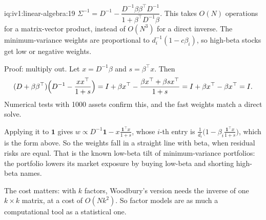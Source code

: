 \begin{solution}{iq:iv1:linear-algebra:19}
$\Sigma^{-1} = D^{-1} - \dfrac{D^{-1}\beta\beta^\top D^{-1}}{1 + \beta^\top D^{-1}\beta}$. This takes $O(N)$ operations for a matrix-vector product, instead of $O(N^3)$ for a direct inverse. The minimum-variance weights are proportional to $d_i^{-1}(1 - c\beta_i)$, so high-beta stocks get low or negative weights.

Proof: multiply out. Let $x = D^{-1}\beta$ and $s = \beta^\top x$. Then
\[
(D + \beta\beta^\top)\Bigl(D^{-1} - \frac{xx^\top}{1 + s}\Bigr) = I + \beta x^\top - \frac{\beta x^\top + \beta s x^\top}{1 + s} = I + \beta x^\top - \beta x^\top = I.
\]
Numerical tests with 1000 assets confirm this, and the fast weights match a direct solve.

Applying it to $\mathbf{1}$ gives $w \propto D^{-1}\mathbf{1} - x\frac{\mathbf{1}^\top x}{1 + s}$, whose $i$-th entry is $\frac{1}{d_i}\bigl(1 - \beta_i\frac{\mathbf{1}^\top x}{1 + s}\bigr)$, which is the form above. So the weights fall in a straight line with beta, when residual risks are equal. That is the known low-beta tilt of minimum-variance portfolios: the portfolio lowers its market exposure by buying low-beta and shorting high-beta names.

The cost matters: with $k$ factors, Woodbury's version needs the inverse of one $k \times k$ matrix, at a cost of $O(Nk^2)$. So factor models are as much a computational tool as a statistical one.

\end{solution}

